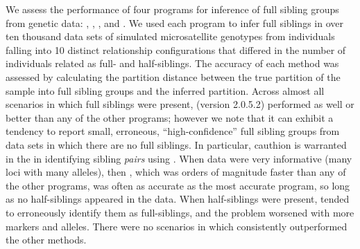 

We assess the performance of four programs for inference of full sibling groups from
genetic data: \colony{} \citep{wang04,Wang2012pairwise}, \prt{} 
\citep{almudevar99}, \familyfinder{} \citep{beyer03}, and \kinalyzer{} 
\citep{bergerwolf07, sheik08}. We used each program to infer full siblings
in over ten thousand data sets of simulated microsatellite  
genotypes from individuals falling into 10 distinct relationship configurations
that differed in the number of individuals related as full- and half-siblings. 
The accuracy of
each method was assessed by calculating the partition distance between the true partition
of the sample into full sibling groups and the inferred partition. Across almost all
scenarios in which full siblings were present, \colony{} (version 2.0.5.2) performed as well or better than
any of the other programs; however we note that it can exhibit a tendency to report 
small, erroneous, ``high-confidence'' full sibling groups from data sets in which there
are no full siblings. In particular, cauthion is warranted in the in identifying sibling
{\em pairs} using \colony{}.  When data were very informative (many loci with many alleles), then
\familyfinder{}, which was orders of magnitude faster than any of the other programs,
was often as accurate as the most accurate program, so long as no
half-siblings appeared in the data.  When half-siblings
were present, \familyfinder{} tended to erroneously identify
them as full-siblings, and the problem worsened with more markers and alleles.
There were no scenarios in which \kinalyzer{} consistently outperformed the other methods.

